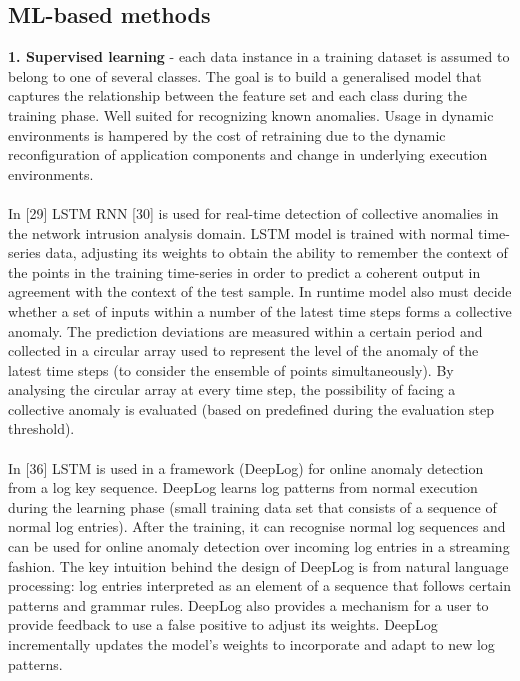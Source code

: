 \documentclass[]{usiinfprospectus}
\begin{document}
\subsection{ML-based methods}
\textbf {1. Supervised learning} - each data instance in a training dataset is assumed to belong to one of several classes. The goal is to build a generalised model that captures the relationship between the feature set and each class during the training phase. Well suited for recognizing known anomalies. Usage in dynamic environments is hampered by the cost of retraining due to the dynamic reconfiguration of application components and change in underlying execution environments.\\\\
In [29] LSTM RNN [30] is used for real-time detection of collective anomalies in the network intrusion analysis domain. LSTM model is trained with normal time-series data, adjusting its weights to obtain the ability to remember the context of the points in the training time-series in order to predict a coherent output in agreement with the context of the test sample. In runtime model also must decide whether a set of inputs within a number of the latest time steps forms a collective anomaly. The prediction deviations are measured within a certain period and collected in a circular array used to represent the level of the anomaly of the latest time steps (to consider the ensemble of points simultaneously). By analysing the circular array at every time step, the possibility of facing a collective anomaly is evaluated (based on predefined during the evaluation step threshold).\\\\
In [36] LSTM is used in a framework (DeepLog) for online anomaly detection from a log key sequence. DeepLog learns log patterns from normal execution during the learning phase (small training data set that consists of a sequence of normal log entries). After the training, it can recognise normal log sequences and can be used for online anomaly detection over incoming log entries in a streaming fashion. The key intuition behind the design of DeepLog is from natural language processing: log entries interpreted as an element of a sequence that follows certain patterns and grammar rules. DeepLog also provides a mechanism for a user to provide feedback to use a false positive to adjust its weights. DeepLog incrementally updates the model's weights to incorporate and adapt to new log patterns.\\\\
\end{document}
